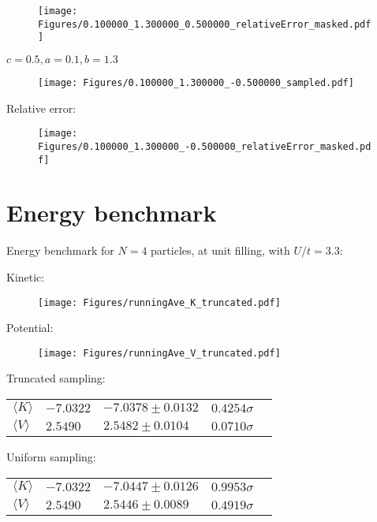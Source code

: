 \documentclass[12pt, two sided]{article}
\begin{document}
\begin{figure}[h!]
\texttt{[image: Figures/0.100000\_1.300000\_0.500000\_relativeError\_masked.pdf]}
\end{figure}

$ c=0.5 , a = 0.1, b = 1.3 $

\begin{figure}[h!]
\texttt{[image: Figures/0.100000\_1.300000\_-0.500000\_sampled.pdf]}
\end{figure}

Relative error:

\begin{figure}[h!]
\texttt{[image: Figures/0.100000\_1.300000\_-0.500000\_relativeError\_masked.pdf]}
\end{figure}


\section{Energy benchmark}

Energy benchmark for $N=4$ particles, at unit filling, with $U/t=3.3$:

Kinetic:
\begin{figure}[h!]
\texttt{[image: Figures/runningAve\_K\_truncated.pdf]}
\end{figure}

Potential:

\begin{figure}[h!]
\texttt{[image: Figures/runningAve\_V\_truncated.pdf]}
\end{figure}

Truncated sampling:

\begin{table}[h!]
\begin{tabular}{lllll}
 $\langle K \rangle$ &  $-7.0322$ &  $-7.0378 \pm 0.0132$ & $0.4254\sigma$  \\
 $\langle V \rangle$ & $2.5490$ & $2.5482 \pm 0.0104$  & $0.0710\sigma$\\
\end{tabular}
\end{table}

Uniform sampling:

\begin{table}[h!]
\begin{tabular}{lllll}
 $\langle K \rangle$ &  $-7.0322$ &  $-7.0447 \pm 0.0126$ & $0.9953\sigma$  \\
 $\langle V \rangle$ & $2.5490$ & $2.5446 \pm 0.0089$  & $0.4919\sigma$\\
\end{tabular}
\end{table}
\end{document}
